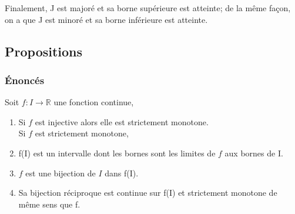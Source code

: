 \documentclass[a4paper,10pt]{book} %
\newcommand{\R}{\mathbb{R}}
\begin{document}
Finalement, J est majoré et sa borne supérieure est atteinte; de la même façon, on a que J est minoré et sa borne inférieure est atteinte.

\subsection{Propositions}
\subsubsection{Énoncés}
Soit $f :I\rightarrow \R$ une fonction continue,
\begin{enumerate} \item Si $f$ est injective alors elle est strictement monotone.\\

Si $f$ est strictement monotone,
\item f(I) est un intervalle dont les bornes sont les limites de $f$ aux bornes de I.
\item $f$ est une bijection de $I$ dans f(I).
\item Sa bijection réciproque est continue sur f(I) et strictement monotone de même sens que f.\end{enumerate}
\end{document}
